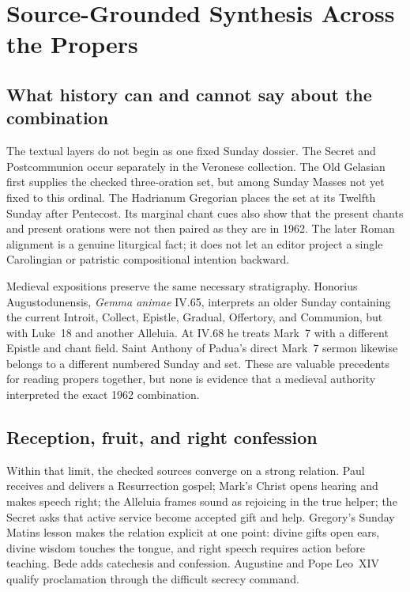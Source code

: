 \sectionguard
\section*{Source-Grounded Synthesis Across the Propers}

\subsection*{What history can and cannot say about the combination}

The textual layers do not begin as one fixed Sunday dossier. The Secret and
Postcommunion occur separately in the Veronese collection. The Old Gelasian
first supplies the checked three-oration set, but among Sunday Masses not yet
fixed to this ordinal. The Hadrianum Gregorian places the set at its Twelfth
Sunday after Pentecost. Its marginal chant cues also show that the present
chants and present orations were not then paired as they are in 1962. The
later Roman alignment is a genuine liturgical fact; it does not let an editor
project a single Carolingian or patristic compositional intention backward.

Medieval expositions preserve the same necessary stratigraphy. Honorius
Augustodunensis, \emph{Gemma animae} IV.65, interprets an older Sunday
containing the current Introit, Collect, Epistle, Gradual, Offertory, and
Communion, but with Luke~18 and another Alleluia. At IV.68 he treats Mark~7
with a different Epistle and chant field. Saint Anthony of Padua's direct
Mark~7 sermon likewise belongs to a different numbered Sunday and set. These
are valuable precedents for reading propers together, but none is evidence
that a medieval authority interpreted the exact 1962 combination.

\subsection*{Reception, fruit, and right confession}

Within that limit, the checked sources converge on a strong relation. Paul
receives and delivers a Resurrection gospel; Mark's Christ opens hearing and
makes speech right; the Alleluia frames sound as rejoicing in the true helper;
the Secret asks that active service become accepted gift and help. Gregory's
Sunday Matins lesson makes the relation explicit at one point: divine gifts
open ears, divine wisdom touches the tongue, and right speech requires action
before teaching. Bede adds catechesis and confession. Augustine and Pope
Leo~XIV qualify proclamation through the difficult secrecy command.


